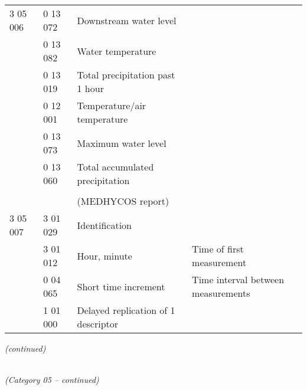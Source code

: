 \begin{longtable}[]{@{}llll@{}}
3 05 006 & 0 13 072 & Downstream water level &\tabularnewline
& 0 13 082 & Water temperature &\tabularnewline
& 0 13 019 & Total precipitation past 1 hour &\tabularnewline
& 0 12 001 & Temperature/air temperature &\tabularnewline
& 0 13 073 & Maximum water level &\tabularnewline
& 0 13 060 & Total accumulated precipitation &\tabularnewline
& & &\tabularnewline
& & (MEDHYCOS report) &\tabularnewline
3 05 007 & 3 01 029 & Identification &\tabularnewline
& 3 01 012 & Hour, minute & Time of first measurement\tabularnewline
& 0 04 065 & Short time increment & Time interval between measurements\tabularnewline
& 1 01 000 & Delayed replication of 1 descriptor &\tabularnewline
\bottomrule
\end{longtable}

\emph{(continued)}

\emph{\\
(Category 05 -- continued)}


